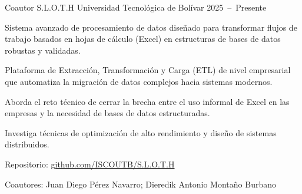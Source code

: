 

\begin{cventries}
  \cventry
    {Coautor}
    {S.L.O.T.H}
    {Universidad Tecnológica de Bolívar}
    {2025~--~Presente}
    {
      \begin{cvitems}
        \item {Sistema avanzado de procesamiento de datos diseñado para transformar flujos de trabajo basados en hojas de cálculo (Excel) en estructuras de bases de datos robustas y validadas.}
        \item {Plataforma de Extracción, Transformación y Carga (ETL) de nivel empresarial que automatiza la migración de datos complejos hacia sistemas modernos.}
        \item {Aborda el reto técnico de cerrar la brecha entre el uso informal de Excel en las empresas y la necesidad de bases de datos estructuradas.}
        \item {Investiga técnicas de optimización de alto rendimiento y diseño de sistemas distribuidos.}
        \item {Repositorio: \href{https://github.com/ISCOUTB/S.L.O.T.H}{github.com/ISCOUTB/S.L.O.T.H}}
        \item {Coautores: Juan Diego Pérez Navarro; Dieredik Antonio Montaño Burbano}
      \end{cvitems}
    }
\end{cventries}
